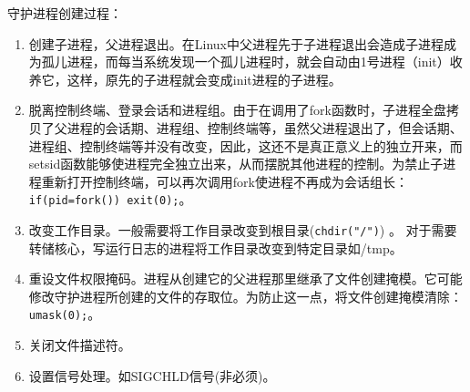 守护进程创建过程：
\begin{enumerate}
  \item 创建子进程，父进程退出。在Linux中父进程先于子进程退出会造成子进程成为孤儿进程，而每当系统发现一个孤儿进程时，就会自动由1号进程（init）收养它，这样，原先的子进程就会变成init进程的子进程。
  \item 脱离控制终端、登录会话和进程组。由于在调用了fork函数时，子进程全盘拷贝了父进程的会话期、进程组、控制终端等，虽然父进程退出了，但会话期、进程组、控制终端等并没有改变，因此，这还不是真正意义上的独立开来，而setsid函数能够使进程完全独立出来，从而摆脱其他进程的控制。为禁止子进程重新打开控制终端，可以再次调用fork使进程不再成为会话组长：\verb$if(pid=fork()) exit(0);$。
  \item 改变工作目录。一般需要将工作目录改变到根目录(\verb$chdir("/")$) 。
    对于需要转储核心，写运行日志的进程将工作目录改变到特定目录如/tmp。
  \item 重设文件权限掩码。进程从创建它的父进程那里继承了文件创建掩模。它可能修改守护进程所创建的文件的存取位。为防止这一点，将文件创建掩模清除：\verb$umask(0);$。
  \item 关闭文件描述符。
  \item 设置信号处理。如SIGCHLD信号(非必须)。
\end{enumerate}

